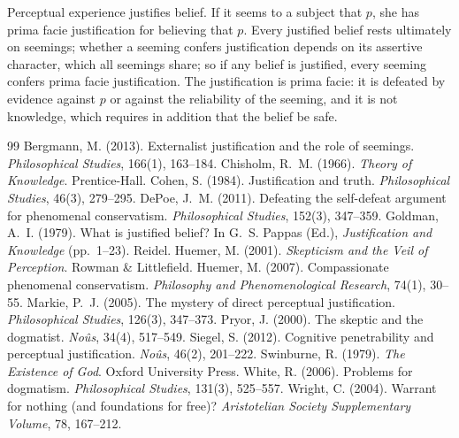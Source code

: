 \documentclass{situationist-preprint}
\begin{document}
Perceptual experience justifies belief. If it seems to a subject that $p$, she has prima facie justification for believing that $p$. Every justified belief rests ultimately on seemings; whether a seeming confers justification depends on its assertive character, which all seemings share; so if any belief is justified, every seeming confers prima facie justification. The justification is prima facie: it is defeated by evidence against $p$ or against the reliability of the seeming, and it is not knowledge, which requires in addition that the belief be safe.

\begin{thebibliography}{99}\small
{} Bergmann, M. (2013). Externalist justification and the role of seemings. \emph{Philosophical Studies}, 166(1), 163--184.
 Chisholm, R.~M. (1966). \emph{Theory of Knowledge}. Prentice-Hall.
 Cohen, S. (1984). Justification and truth. \emph{Philosophical Studies}, 46(3), 279--295.
 DePoe, J.~M. (2011). Defeating the self-defeat argument for phenomenal conservatism. \emph{Philosophical Studies}, 152(3), 347--359.
 Goldman, A.~I. (1979). What is justified belief? In G.~S. Pappas (Ed.), \emph{Justification and Knowledge} (pp.~1--23). Reidel.
 Huemer, M. (2001). \emph{Skepticism and the Veil of Perception}. Rowman \& Littlefield.
 Huemer, M. (2007). Compassionate phenomenal conservatism. \emph{Philosophy and Phenomenological Research}, 74(1), 30--55.
 Markie, P.~J. (2005). The mystery of direct perceptual justification. \emph{Philosophical Studies}, 126(3), 347--373.
 Pryor, J. (2000). The skeptic and the dogmatist. \emph{No\^us}, 34(4), 517--549.
 Siegel, S. (2012). Cognitive penetrability and perceptual justification. \emph{No\^us}, 46(2), 201--222.
 Swinburne, R. (1979). \emph{The Existence of God}. Oxford University Press.
 White, R. (2006). Problems for dogmatism. \emph{Philosophical Studies}, 131(3), 525--557.
 Wright, C. (2004). Warrant for nothing (and foundations for free)? \emph{Aristotelian Society Supplementary Volume}, 78, 167--212.
\end{thebibliography}
\end{document}
